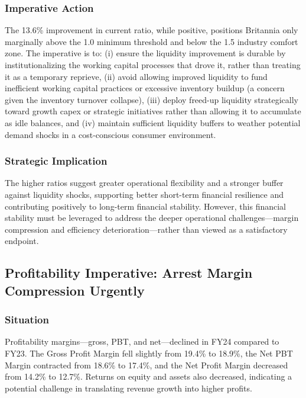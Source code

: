 \documentclass[12pt, a4paper]{report}
\begin{document}
\subsubsection{Imperative Action}
The 13.6\% improvement in current ratio, while positive, positions Britannia only marginally above the 1.0 minimum threshold and below the 1.5 industry comfort zone. The imperative is to: (i) ensure the liquidity improvement is durable by institutionalizing the working capital processes that drove it, rather than treating it as a temporary reprieve, (ii) avoid allowing improved liquidity to fund inefficient working capital practices or excessive inventory buildup (a concern given the inventory turnover collapse), (iii) deploy freed-up liquidity strategically toward growth capex or strategic initiatives rather than allowing it to accumulate as idle balances, and (iv) maintain sufficient liquidity buffers to weather potential demand shocks in a cost-conscious consumer environment.

\subsubsection{Strategic Implication}
The higher ratios suggest greater operational flexibility and a stronger buffer against liquidity shocks, supporting better short-term financial resilience and contributing positively to long-term financial stability. However, this financial stability must be leveraged to address the deeper operational challenges—margin compression and efficiency deterioration—rather than viewed as a satisfactory endpoint.

\subsection{Profitability Imperative: Arrest Margin Compression Urgently}

\subsubsection{Situation}
Profitability margins—gross, PBT, and net—declined in FY24 compared to FY23. The Gross Profit Margin fell slightly from 19.4\% to 18.9\%, the Net PBT Margin contracted from 18.6\% to 17.4\%, and the Net Profit Margin decreased from 14.2\% to 12.7\%. Returns on equity and assets also decreased, indicating a potential challenge in translating revenue growth into higher profits.
\end{document}
